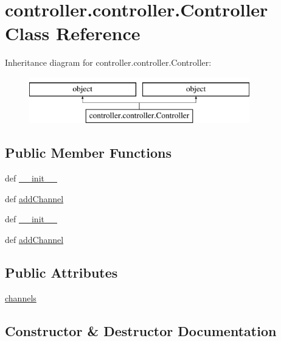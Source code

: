 \hypertarget{classcontroller_1_1controller_1_1Controller}{}\section{controller.\+controller.\+Controller Class Reference}
\label{classcontroller_1_1controller_1_1Controller}
Inheritance diagram for controller.\+controller.\+Controller\+:\begin{figure}[H]
\begin{center}
\leavevmode
\includegraphics[height=2.000000cm]{classcontroller_1_1controller_1_1Controller}
\end{center}
\end{figure}
\subsection*{Public Member Functions}
\begin{DoxyCompactItemize}
\item 
def \hyperlink{classcontroller_1_1controller_1_1Controller_a3d1afce0394fdd46f748161ac6078bd1}{\+\_\+\+\_\+init\+\_\+\+\_\+}
\item 
def \hyperlink{classcontroller_1_1controller_1_1Controller_a5302cdeab4a3beda9c476188bad72023}{add\+Channel}
\item 
def \hyperlink{classcontroller_1_1controller_1_1Controller_a3d1afce0394fdd46f748161ac6078bd1}{\+\_\+\+\_\+init\+\_\+\+\_\+}
\item 
def \hyperlink{classcontroller_1_1controller_1_1Controller_a5302cdeab4a3beda9c476188bad72023}{add\+Channel}
\end{DoxyCompactItemize}
\subsection*{Public Attributes}
\begin{DoxyCompactItemize}
\item 
\hyperlink{classcontroller_1_1controller_1_1Controller_a954001a416c1af88b29758ccede576c1}{channels}
\end{DoxyCompactItemize}


\subsection{Constructor \& Destructor Documentation}
\hypertarget{classcontroller_1_1controller_1_1Controller_a3d1afce0394fdd46f748161ac6078bd1}{}
